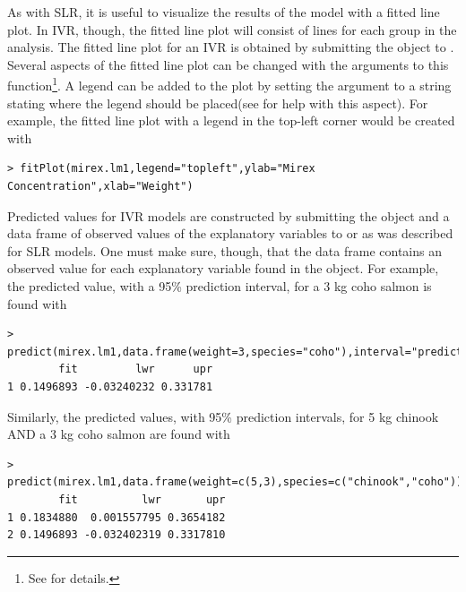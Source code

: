 \documentclass[10pt,openany]{book}\usepackage[]{graphicx}\usepackage[]{color}
\makeatletter
\newenvironment{kframe}{%
 \def\at@end@of@kframe{}%
 \ifinner\ifhmode%
  \def\at@end@of@kframe{\end{minipage}}%
  \begin{minipage}{\columnwidth}%
 \fi\fi%
 \def\FrameCommand##1{\hskip\@totalleftmargin \hskip-\fboxsep
 \colorbox{shadecolor}{##1}\hskip-\fboxsep
     \hskip-\linewidth \hskip-\@totalleftmargin \hskip\columnwidth}%
 \MakeFramed {\advance\hsize-\width
   \@totalleftmargin\z@ \linewidth\hsize
   \@setminipage}}%
 {\par\unskip\endMakeFramed%
 \at@end@of@kframe}
\newenvironment{knitrout}{}{} %
\makeatother
\begin{document}
As with SLR, it is useful to visualize the results of the model with a fitted line plot.  In IVR, though, the fitted line plot will consist of lines for each group in the analysis.  The fitted line plot for an IVR is obtained by submitting the  object to .  Several aspects of the fitted line plot can be changed with the arguments to this function\footnote{See  for details.}.  A legend can be added to the plot by setting the  argument to a string stating where the legend should be placed(see  for help with this aspect).  For example, the fitted line plot with a legend in the top-left corner would be created with

\begin{knitrout}
\color{fgcolor}\begin{kframe}
\begin{verbatim}
> fitPlot(mirex.lm1,legend="topleft",ylab="Mirex Concentration",xlab="Weight")
\end{verbatim}
\end{kframe}
\end{knitrout}

Predicted values for IVR models are constructed by submitting the  object and a data frame of observed values of the explanatory variables to  or  as was described for SLR models.  One must make sure, though, that the data frame contains an observed value for each explanatory variable found in the  object.  For example, the predicted value, with a 95\% prediction interval, for a 3 kg coho salmon is found with

\begin{knitrout}
\color{fgcolor}\begin{kframe}
\begin{verbatim}
> predict(mirex.lm1,data.frame(weight=3,species="coho"),interval="prediction")
        fit         lwr      upr
1 0.1496893 -0.03240232 0.331781
\end{verbatim}
\end{kframe}
\end{knitrout}

Similarly, the predicted values, with 95\% prediction intervals, for 5 kg chinook AND a 3 kg coho salmon are found with

\begin{knitrout}
\color{fgcolor}\begin{kframe}
\begin{verbatim}
> predict(mirex.lm1,data.frame(weight=c(5,3),species=c("chinook","coho")),interval="prediction")
        fit          lwr       upr
1 0.1834880  0.001557795 0.3654182
2 0.1496893 -0.032402319 0.3317810
\end{verbatim}
\end{kframe}
\end{knitrout}
\end{document}
